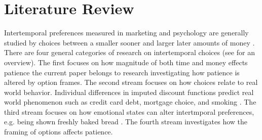 \documentclass[]{article}
\begin{document}
%


%

\section{Literature Review}

Intertemporal preferences measured in marketing and psychology are generally studied by choices between a smaller sooner and larger later amounts of money \cite{Zauberman2014}. 
There are four general categories of research on  intertemporal choices (see  for an overview).
The first focuses on how magnitude of both time and money effects patience \cite{Scholten2006, Thaler1981}
the current paper belongs to research investigating how patience is altered by option frames. 
The second stream focuses on how choices relate to real world behavior.
Individual differences in imputed discount functions predict real world phenomenon such as credit card debt,  mortgage choice, and smoking \cite{MacKillop2011, Meier2009, Johnson2011}. 
The third stream focuses on how emotional states can alter intertmporal preferences, e.g. being shown freshly baked bread \cite{Li2008}. 
The fourth stream investigates how the framing of options affects patience. 
\end{document}
